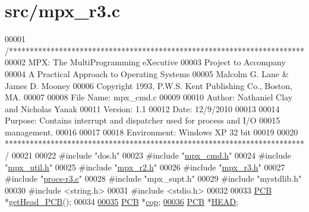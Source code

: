 \hypertarget{mpx__r3_8c_source}{
\section{src/mpx\_\-r3.c}
}

\begin{DoxyCode}
00001 \textcolor{comment}{/***********************************************************************}
00002 \textcolor{comment}{        MPX: The MultiProgramming eXecutive}
00003 \textcolor{comment}{        Project to Accompany}
00004 \textcolor{comment}{        A Practical Approach to Operating Systems}
00005 \textcolor{comment}{        Malcolm G. Lane & James D. Mooney}
00006 \textcolor{comment}{        Copyright 1993, P.W.S. Kent Publishing Co., Boston, MA.}
00007 \textcolor{comment}{}
00008 \textcolor{comment}{        File Name:      mpx\_cmd.c}
00009 \textcolor{comment}{}
00010 \textcolor{comment}{        Author: Nathaniel Clay and Nicholas Yanak}
00011 \textcolor{comment}{        Version: 1.1}
00012 \textcolor{comment}{        Date:  12/9/2010}
00013 \textcolor{comment}{}
00014 \textcolor{comment}{        Purpose: Contains interrupt and dispatcher used for process and I/O}
00015 \textcolor{comment}{        management.}
00016 \textcolor{comment}{}
00017 \textcolor{comment}{                }
00018 \textcolor{comment}{        Environment: Windows XP 32 bit}
00019 \textcolor{comment}{}
00020 \textcolor{comment}{************************************************************************/}
00021 
00022 \textcolor{preprocessor}{#include "dos.h"}
00023 \textcolor{preprocessor}{#include "\hyperlink{mpx__cmd_8h}{mpx_cmd.h}"}
00024 \textcolor{preprocessor}{#include "\hyperlink{mpx__util_8h}{mpx_util.h}"}
00025 \textcolor{preprocessor}{#include "\hyperlink{mpx__r2_8h}{mpx_r2.h}"}
00026 \textcolor{preprocessor}{#include "\hyperlink{_m_p_x___r3_8_h}{mpx_r3.h}"}
00027 \textcolor{preprocessor}{#include "\hyperlink{procs-r3_8c}{procs-r3.c}"}
00028 \textcolor{preprocessor}{#include "mpx\_supt.h"}
00029 \textcolor{preprocessor}{#include "mystdlib.h"}
00030 \textcolor{preprocessor}{#include <string.h>}
00031 \textcolor{preprocessor}{#include <stdio.h>}
00032 
00033 \hyperlink{structprocess}{PCB} *\hyperlink{mpx__r3_8c_aa7b04f866ead346c0357975285de0c38}{getHead_PCB}();
00034 
\hypertarget{mpx__r3_8c_source_l00035}{}\hyperlink{mpx__r3_8c_a199c6145b9b5ee43b3961894ee22830a}{00035} \hyperlink{structprocess}{PCB} *\hyperlink{mpx__r3_8c_a199c6145b9b5ee43b3961894ee22830a}{cop};
\hypertarget{mpx__r3_8c_source_l00036}{}\hyperlink{mpx__r3_8c_a47c9132f8122c8d3c1e281fb0b55f245}{00036} \hyperlink{structprocess}{PCB} *\hyperlink{mpx__r3_8c_a47c9132f8122c8d3c1e281fb0b55f245}{HEAD};

\end{DoxyCode}
